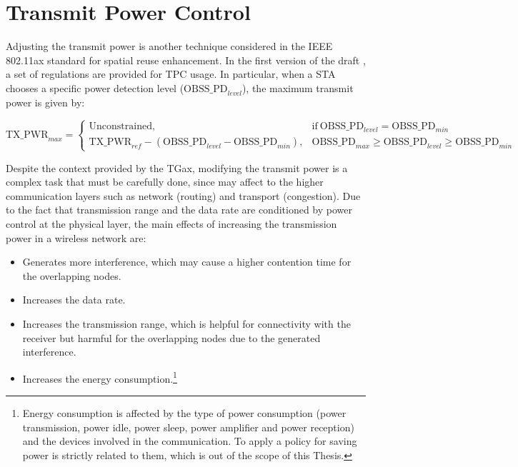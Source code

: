 \documentclass[12pt, a4paper,twoside]{tesi_upf}
\begin{document}
			\section{Transmit Power Control}
			\label{section:tpc}
				Adjusting the transmit power is another technique considered in the IEEE 802.11ax standard for spatial reuse enhancement. In the first version of the draft \cite{tgax2016draft}, a set of regulations are provided for TPC usage. In particular, when a STA chooses a specific power detection level ($\text{OBSS\_PD}_{level}$), the maximum transmit power is given by:						
				\begin{scriptsize}
					\begin{equation}
					\text{TX\_PWR}_{max}=
					\begin{cases}
					\text{Unconstrained}, & \text{if}\ \text{OBSS\_PD}_{level} = \text{OBSS\_PD}_{min} \\
					\text{TX\_PWR}_{ref}-(\text{OBSS\_PD}_{level}-\text{OBSS\_PD}_{min}), & \text{OBSS\_PD}_{max} \geq \text{OBSS\_PD}_{level} \geq \text{OBSS\_PD}_{min}
					\end{cases}
					\nonumber
					\end{equation}				
				\end{scriptsize}				
				Despite the context provided by the TGax, modifying the transmit power is a complex task that must be carefully done, since may affect to the higher communication layers such as network (routing) and transport (congestion). Due to the fact that transmission range and the data rate are conditioned by power control at the physical layer, the main effects of increasing the transmission power in a wireless network are:
				\begin{itemize}
					\item Generates more interference, which may cause a higher contention time for the overlapping nodes.
					\item Increases the data rate.
					\item Increases the transmission range, which is helpful for connectivity with the receiver but harmful for the overlapping nodes due to the generated interference.
					\item Increases the energy consumption.\footnote{Energy consumption is affected by the type of power consumption (power transmission, power idle, power sleep, power amplifier and power reception) and the devices involved in the communication. To apply a policy for saving power is strictly related to them, which is out of the scope of this Thesis.}
				\end{itemize}				
\end{document}
